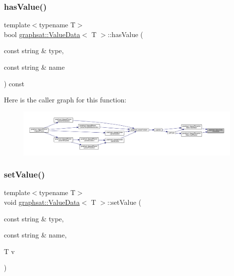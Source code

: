 \mbox{\label{classgraphsat_1_1_value_data_a27fa3eb0807a8822cf2fb0262d93b14b}} 
\subsubsection{\texorpdfstring{hasValue()}{hasValue()}}
{\footnotesize\ttfamily template$<$typename T$>$ \\
bool \mbox{\hyperlink{classgraphsat_1_1_value_data}{graphsat\+::\+Value\+Data}}$<$ T $>$\+::has\+Value (\begin{DoxyParamCaption}\item[{const string \&}]{type,  }\item[{const string \&}]{name }\end{DoxyParamCaption}) const\hspace{0.3cm}{\ttfamily [inline]}}

Here is the caller graph for this function\+:
\nopagebreak
\begin{figure}[H]
\begin{center}
\leavevmode
\includegraphics[width=350pt]{classgraphsat_1_1_value_data_a27fa3eb0807a8822cf2fb0262d93b14b_icgraph}
\end{center}
\end{figure}
\mbox{\label{classgraphsat_1_1_value_data_a5a2ec95b007418d2c4278d68b4b567d6}} 
\subsubsection{\texorpdfstring{setValue()}{setValue()}}
{\footnotesize\ttfamily template$<$typename T$>$ \\
void \mbox{\hyperlink{classgraphsat_1_1_value_data}{graphsat\+::\+Value\+Data}}$<$ T $>$\+::set\+Value (\begin{DoxyParamCaption}\item[{const string \&}]{type,  }\item[{const string \&}]{name,  }\item[{T}]{v }\end{DoxyParamCaption})\hspace{0.3cm}{\ttfamily [inline]}}


